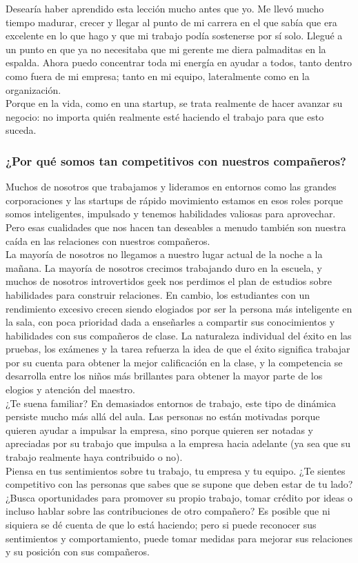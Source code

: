 \documentclass[10pt]{book}
\begin{document}
Desearía haber aprendido esta lección mucho antes que yo. Me llevó mucho tiempo madurar, crecer y llegar al punto de mi carrera en el que sabía que era excelente en lo que hago y que mi trabajo podía sostenerse por sí solo. Llegué a un punto en que ya no necesitaba que mi gerente me diera palmaditas en la espalda. Ahora puedo concentrar toda mi energía en ayudar a todos, tanto dentro como fuera de mi empresa; tanto en mi equipo, lateralmente como en la organización.\\
Porque en la vida, como en una startup, se trata realmente de hacer avanzar su negocio: no importa quién realmente esté haciendo el trabajo para que esto suceda.\\
\subsubsection{¿Por qué somos tan competitivos con nuestros compañeros?}
Muchos de nosotros que trabajamos y lideramos en entornos como las grandes corporaciones y las startups de rápido movimiento estamos en esos roles porque somos inteligentes, impulsado y tenemos habilidades valiosas para aprovechar. Pero esas cualidades que nos hacen tan deseables a menudo también son nuestra caída en las relaciones con nuestros compañeros.\\
La mayoría de nosotros no llegamos a nuestro lugar actual de la noche a la mañana. La mayoría de nosotros crecimos trabajando duro en la escuela, y muchos de nosotros introvertidos geek nos perdimos el plan de estudios sobre habilidades para construir relaciones. En cambio, los estudiantes con un rendimiento excesivo crecen siendo elogiados por ser la persona más inteligente en la sala, con poca prioridad dada a enseñarles a compartir sus conocimientos y habilidades con sus compañeros de clase. La naturaleza individual del éxito en las pruebas, los exámenes y la tarea refuerza la idea de que el éxito significa trabajar por su cuenta para obtener la mejor calificación en la clase, y la competencia se desarrolla entre los niños más brillantes para obtener la mayor parte de los elogios y atención del maestro.\\
¿Te suena familiar? En demasiados entornos de trabajo, este tipo de dinámica persiste mucho más allá del aula. Las personas no están motivadas porque quieren ayudar a impulsar la empresa, sino porque quieren ser notadas y apreciadas por su trabajo que impulsa a la empresa hacia adelante (ya sea que su trabajo realmente haya contribuido o no). \\
Piensa en tus sentimientos sobre tu trabajo, tu empresa y tu equipo. ¿Te sientes competitivo con las personas que sabes que se supone que deben estar de tu lado? ¿Busca oportunidades para promover su propio trabajo, tomar crédito por ideas o incluso hablar sobre las contribuciones de otro compañero? Es posible que ni siquiera se dé cuenta de que lo está haciendo; pero si puede reconocer sus sentimientos y comportamiento, puede tomar medidas para mejorar sus relaciones y su posición con sus compañeros.\\
\end{document}
